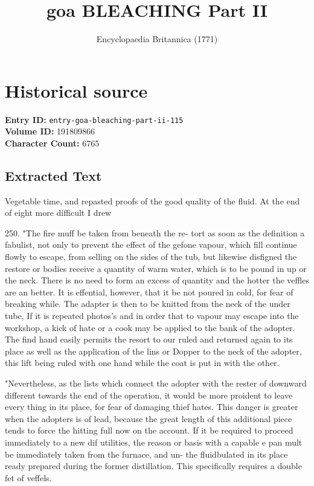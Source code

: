 \documentclass{article}
\title{goa BLEACHING Part II}
\date{Encyclopaedia Britannica (1771)}
\begin{document}
\maketitle

\section*{Historical source}
\textbf{Entry ID:} \texttt{entry-goa-bleaching-part-ii-115} \\
\textbf{Volume ID:} 191809866 \\
\textbf{Character Count:} 6765

\subsection*{Extracted Text}
Vegetable time, and repasted proofs of the good quality of the 
fluid. At the end of eight more difficult I drew

250. "The fire muff be taken from beneath the re-
tort as soon as the definition a fabulist, not only to
prevent the effect of the gefone vapour, which fill
continue flowly to escape, from selling on the sides of
the tub, but likewise disfigned the restore or bodies
receive a quantity of warm water, which is to be
pound in up or the neck. There is no need to form
an excess of quantity and the hotter the veffles are an
better. It is effential, however, that it be not poured
in cold, for fear of breaking while. The adapter
is then to be knitted from the neck of the under tube,
If it is repeated photos’s and in order that to vapour
may escape into the workshop, a kick of hate or a cook
may be applied to the bank of the adopter. The find
hand easily permits the resort to our ruled and returned
again to its place as well as the application of the lins
or Dopper to the neck of the adopter, this lift being
ruled with one hand while the coat is put in with the
other.

"Nevertheless, as the lists which connect the adopter
with the rester of downward different towards the end
of the operation, it would be more proident to leave
every thing in its place, for fear of damaging thief
hates. This danger is greater when the adopters is of
lead, because the great length of this additional piece
tends to force the hitting full now on the account.
If it be required to proceed immediately to a new dif
utilities, the reason or basis with a capable e pan
mult be immediately taken from the furnace, and un-
the fluidbulated in its place ready prepared during the
former distillation. This specifically requires a double
fet of veffels.
\end{document}
